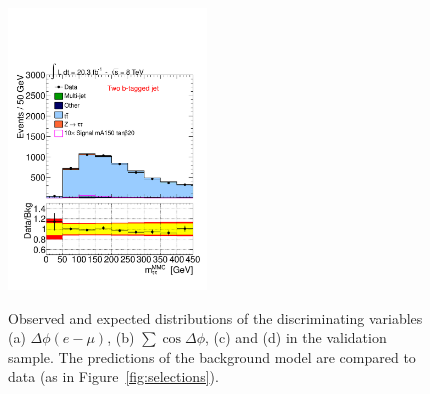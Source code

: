 \begin{figure}[htp]
\begin{center}
{            \includegraphics[page=4,width=0.47\textwidth]{figure/final_plots/twobtag.pdf}
        }

    \end{center}
    \caption{ Observed and expected distributions of the discriminating variables (a) $\Delta\phi(e-\mu)$,
      (b) $\sum\cos\Delta\phi$, (c) \SumLtMET and (d) \Ht  in the \ttbar validation sample.
	The predictions of the  background model are compared to  data (as in Figure~\ref{fig:selections}).}
 
   \label{fig:cutsttbar}
\end{figure}



